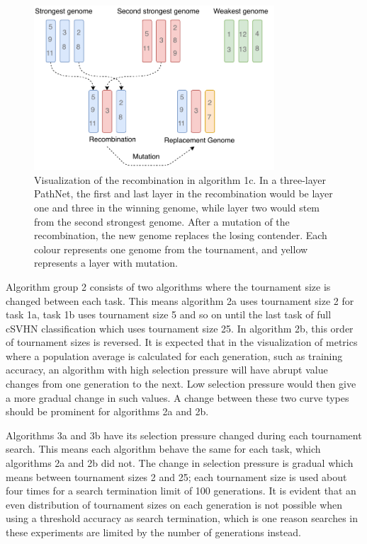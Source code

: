 \begin{figure}[ht]
    \centering
    \includegraphics[width=0.8\textwidth]{Chapters/4.Experiments/exp2/figures/Recombination_algorithm.pdf}
    \caption[Recombination algorithm]{Visualization of the recombination in algorithm 1c. In a three-layer PathNet, the first and last layer in the recombination would be layer one and three in the winning genome, while layer two would stem from the second strongest genome. After a mutation of the recombination, the new genome replaces the losing contender. Each colour represents one genome from the tournament, and yellow represents a layer with mutation.}
    \label{fig:search.recombination_algorithm}
\end{figure}

Algorithm group 2 consists of two algorithms where the tournament size is changed between each task. This means algorithm 2a uses tournament size 2 for task 1a, task 1b uses tournament size 5 and so on until the last task of full cSVHN classification which uses tournament size 25. In algorithm 2b, this order of tournament sizes is reversed. It is expected that in the visualization of metrics where a population average is calculated for each generation, such as training accuracy, an algorithm with high selection pressure will have abrupt value changes from one generation to the next. Low selection pressure would then give a more gradual change in such values. A change between these two curve types should be prominent for algorithms 2a and 2b.

Algorithms 3a and 3b have its selection pressure changed during each tournament search. This means each algorithm behave the same for each task, which algorithms 2a and 2b did not. The change in selection pressure is gradual which means between tournament sizes 2 and 25; each tournament size is used about four times for a search termination limit of 100 generations. It is evident that an even distribution of tournament sizes on each generation is not possible when using a threshold accuracy as search termination, which is one reason searches in these experiments are limited by the number of generations instead. 

